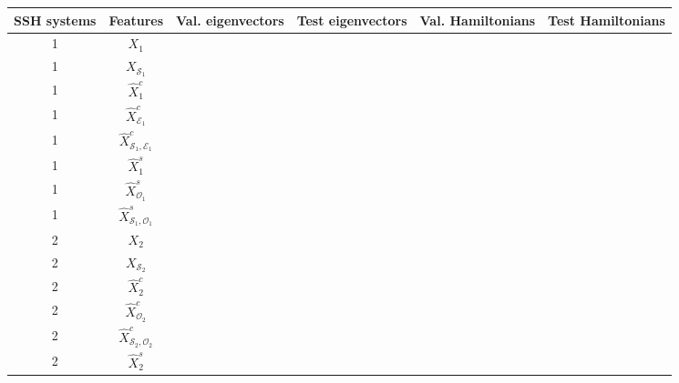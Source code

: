 \documentclass[10pt]{revtex4-1}
\newcommand\accPrec{4}  %
\newcommand{\tableRow}[1]{\\[#1 cm]}
\newcommand{\tableRowHeader}[1]{\\[#1 cm]\hline}
\newcommand\tableRowHeaderEnd{\tableRowHeader{0.3}}
\newcommand\tableRowEnd{\tableRow{0.15}}
\newcommand\SSHSys{SSH systems}
\newcommand\Feat{Features}
\newcommand\ValEig{Val. eigenvectors}
\newcommand\TestEig{Test eigenvectors}
\newcommand\ValHam{Val. Hamiltonians}
\newcommand\TestHam{Test Hamiltonians}
\newcommand\xOne{$X_1$}
\newcommand\xOneEigVal{\fpeval{round(0.96392276,\accPrec)}}
\newcommand\xOneEigTest{\fpeval{round(0.78966836492891,\accPrec)}}
\newcommand\xOneHamVal{\fpeval{round(1.0,\accPrec)}}
\newcommand\xOneHamTest{\fpeval{round(0.9918720379146919,\accPrec)}}
\newcommand\xSOne{$X_{\mathcal{S}_1}$}
\newcommand\xSOneEigVal{\fpeval{round(0.9444134200000001,\accPrec)}}
\newcommand\xSOneEigTest{\fpeval{round(0.7763444312796207,\accPrec)}}
\newcommand\xSOneHamVal{\fpeval{round(0.9853300000000002,\accPrec)}}
\newcommand\xcOne{$\hat{X}^c_1$}
\newcommand\xcOneEigVal{\fpeval{round(0.9521145999999999,\accPrec)}}
\newcommand\xcOneEigTest{\fpeval{round(0.7373592417061612,\accPrec)}}
\newcommand\xcOneHamVal{\fpeval{round(0.9975820000000002,\accPrec)}}
\newcommand\xcOneHamTest{\fpeval{round(0.9916232227488153,\accPrec)}}
\newcommand\xcEOne{$\hat{X}^c_{\mathcal{E}_1}$}
\newcommand\xcEOneEigVal{\fpeval{round(0.8280291200000001,\accPrec)}}
\newcommand\xcEOneEigTest{\fpeval{round(0.6066537914691943,\accPrec)}}
\newcommand\xcEOneHamVal{\fpeval{round(0.997906,\accPrec)}}
\newcommand\xcEOneHamTest{\fpeval{round(0.9190876777251185,\accPrec)}}
\newcommand\xcSEOne{$\hat{X}^c_{\mathcal{S}_1,\mathcal{E}_1}$}
\newcommand\xcSEOneEigVal{\fpeval{round(0.9444223399999998,\accPrec)}}
\newcommand\xcSEOneEigTest{\fpeval{round(0.8176174170616113,\accPrec)}}
\newcommand\xcSEOneHamVal{\fpeval{round(0.9853120000000001,\accPrec)}}
\newcommand\xcSEOneHamTest{\fpeval{round(0.9933530805687205,\accPrec)}}
\newcommand\xsOne{$\hat{X}^s_1$}
\newcommand\xsOneEigVal{\fpeval{round(0.9533083600000001,\accPrec)}}
\newcommand\xsOneEigTest{\fpeval{round(0.7313738151658769,\accPrec)}}
\newcommand\xsOneHamVal{\fpeval{round(0.9905759999999999,\accPrec)}}
\newcommand\xsOneHamTest{\fpeval{round(0.9855568720379146,\accPrec)}}
\newcommand\xsOOne{$\hat{X}^s_{\mathcal{O}_1}$}
\newcommand\xsOOneEigVal{\fpeval{round(0.6941595600000001,\accPrec)}}
\newcommand\xsOOneEigTest{\fpeval{round(0.5419954976303317,\accPrec)}}
\newcommand\xsOOneHamVal{\fpeval{round(0.7088179999999998,\accPrec)}}
\newcommand\xsOOneHamTest{\fpeval{round(0.4797630331753555,\accPrec)}}
\newcommand\xsSOOne{$\hat{X}^s_{\mathcal{S}_1,\mathcal{O}_1}$}
\newcommand\xsSOOneEigVal{\fpeval{round(0.9456364800000001,\accPrec)}}
\newcommand\xsSOOneEigTest{\fpeval{round(0.7818372037914694,\accPrec)}}
\newcommand\xsSOOneHamVal{\fpeval{round(0.9853839999999998,\accPrec)}}
\newcommand\xsSOOneHamTest{\fpeval{round(0.9398933649289098,\accPrec)}}
\newcommand\xTwo{$X_2$}
\newcommand\xTwoEigVal{\fpeval{round(0.9708922101449275,\accPrec)}}
\newcommand\xTwoEigTest{\fpeval{round(0.6634109429569267,\accPrec)}}
\newcommand\xTwoHamVal{\fpeval{round(0.9972499999999997,\accPrec)}}
\newcommand\xTwoHamTest{\fpeval{round(0.879697322467986,\accPrec)}}
\newcommand\xSTwo{$X_{\mathcal{S}_2}$}
\newcommand\xSTwoEigVal{\fpeval{round(0.9589830072463768,\accPrec)}}
\newcommand\xSTwoEigTest{\fpeval{round(0.6168351571594877,\accPrec)}}
\newcommand\xSTwoHamVal{\fpeval{round(0.9961050724637681,\accPrec)}}
\newcommand\xcTwo{$\hat{X}^c_2$}
\newcommand\xcTwoEigVal{\fpeval{round(0.9740357971014493,\accPrec)}}
\newcommand\xcTwoEigTest{\fpeval{round(0.6895051222351573,\accPrec)}}
\newcommand\xcTwoHamVal{\fpeval{round(0.9976050724637681,\accPrec)}}
\newcommand\xcTwoHamTest{\fpeval{round(0.8862281722933641,\accPrec)}}
\newcommand\xcOTwo{$\hat{X}^c_{\mathcal{O}_2}$}
\newcommand\xcOTwoEigVal{\fpeval{round(0.8989626449275362,\accPrec)}}
\newcommand\xcOTwoEigTest{\fpeval{round(0.5356883585564609,\accPrec)}}
\newcommand\xcOTwoHamVal{\fpeval{round(0.9954927536231883,\accPrec)}}
\newcommand\xcOTwoHamTest{\fpeval{round(0.7896856810244468,\accPrec)}}
\newcommand\xcSOTwo{$\hat{X}^c_{\mathcal{S}_2,\mathcal{O}_2}$}
\newcommand\xcSOTwoEigVal{\fpeval{round(0.8998827173913044,\accPrec)}}
\newcommand\xcSOTwoEigTest{\fpeval{round(0.5029968568102445,\accPrec)}}
\newcommand\xcSOTwoHamVal{\fpeval{round(0.9956086956521739,\accPrec)}}
\newcommand\xcSOTwoHamTest{\fpeval{round(0.7670896391152502,\accPrec)}}
\newcommand\xsTwo{$\hat{X}^s_2$}
\newcommand\xsTwoEigVal{\fpeval{round(0.9735059057971014,\accPrec)}}
\newcommand\xsTwoEigTest{\fpeval{round(0.6878407450523867,\accPrec)}}
\newcommand\xsTwoHamVal{\fpeval{round(0.9970652173913043,\accPrec)}}
\newcommand\xsTwoHamTest{\fpeval{round(0.8898835855646101,\accPrec)}}
\begin{document}
\begin{table}
\begin{tabular}{||c@{\hskip 0.3in} c@{\hskip 0.3in} c@{\hskip 0.3in} c@{\hskip 0.3in} c@{\hskip 0.3in} c||} 
\toprule
\SSHSys               &\Feat             &\ValEig            &\TestEig           &\ValHam              &\TestHam         \tableRowHeaderEnd 
\midrule
1                     &\xOne             &\xOneEigVal        &\xOneEigTest       &\xOneHamVal          &\xOneHamTest       \tableRowEnd
1                     &\xSOne            &\xSOneEigVal       &\xSOneEigTest      &\xSOneHamVal         &\xSOneHamVal       \tableRowEnd
1                     &\xcOne            &\xcOneEigVal       &\xcOneEigTest      &\xcOneHamVal         &\xcOneHamTest      \tableRowEnd
1                     &\xcEOne           &\xcEOneEigVal      &\xcEOneEigTest     &\xcEOneHamVal        &\xcEOneHamTest     \tableRowEnd
1                     &\xcSEOne          &\xcSEOneEigVal     &\xcSEOneEigTest    &\xcSEOneHamVal       &\xcSEOneHamTest    \tableRowEnd
1                     &\xsOne            &\xsOneEigVal       &\xsOneEigTest      &\xsOneHamVal         &\xsOneHamTest      \tableRowEnd
1                     &\xsOOne           &\xsOOneEigVal      &\xsOOneEigTest     &\xsOOneHamVal        &\xsOOneHamTest     \tableRowEnd
1                     &\xsSOOne          &\xsSOOneEigVal     &\xsSOOneEigTest    &\xsSOOneHamVal       &\xsSOOneHamTest    \tableRowEnd
2                     &\xTwo             &\xTwoEigVal        &\xTwoEigTest       &\xTwoHamVal          &\xTwoHamTest       \tableRowEnd
2                     &\xSTwo            &\xSTwoEigVal       &\xSTwoEigTest      &\xSTwoHamVal         &\xSTwoHamVal       \tableRowEnd
2                     &\xcTwo            &\xcTwoEigVal       &\xcTwoEigTest      &\xcTwoHamVal         &\xcTwoHamTest      \tableRowEnd
2                     &\xcOTwo           &\xcOTwoEigVal      &\xcOTwoEigTest     &\xcOTwoHamVal        &\xcOTwoHamTest     \tableRowEnd
2                     &\xcSOTwo          &\xcSOTwoEigVal     &\xcSOTwoEigTest    &\xcSOTwoHamVal       &\xcSOTwoHamTest    \tableRowEnd
2                     &\xsTwo            &\xsTwoEigVal       &\xsTwoEigTest      &\xsTwoHamVal         &\xsTwoHamTest      \tableRowEnd

\end{tabular}
\end{table}
\end{document}
